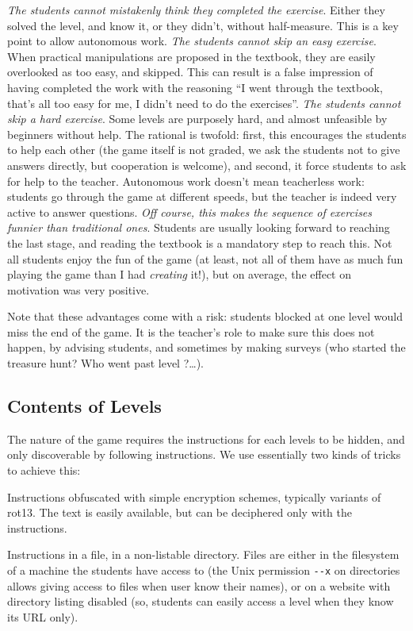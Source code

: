 \documentclass{sig-alternate}
\begin{document}
\textit{The students cannot mistakenly think they completed the
  exercise}. Either they solved the level, and know it, or they didn't,
  without half-measure. This is a key point to allow autonomous work.
\textit{The students cannot skip an easy exercise}. When practical
  manipulations are proposed in the textbook, they are easily
  overlooked as too easy, and skipped. This can result
  is a false impression of having completed the work with the
  reasoning ``I went through the textbook, that's all too easy for me,
  I didn't need to do the exercises''.
\textit{The students cannot skip a hard exercise}. Some levels are
  purposely hard, and almost unfeasible by
  beginners without help. The rational is twofold: first, this
  encourages the students to help each other (the game itself is not
  graded, we ask the students not to give answers directly, but
  cooperation is welcome), and second, it force students to ask for
  help to the teacher. Autonomous work doesn't mean teacherless work:
  students go through the game at different speeds, but the teacher is
  indeed very active to answer questions.
\textit{Off course, this makes the sequence of exercises funnier than
  traditional ones}. Students are usually looking forward to reaching
  the last stage, and reading the textbook is a mandatory step to reach
  this. Not all students enjoy the fun of the game (at least, not all
  of them have as much fun playing the game than I had \emph{creating}
  it!), but on average, the effect on motivation was very positive.

Note that these advantages come with a risk: students blocked at one
level would miss the end of the game. It is the teacher's role to make
sure this does not happen, by advising students, and sometimes by
making surveys (who started the treasure hunt? Who went past level
?\dots).

\subsection{Contents of Levels}

The nature of the game requires the instructions for each levels to be
hidden, and only discoverable by following instructions. We use
essentially two kinds of tricks to achieve this:

\begin{compactitem}
\item Instructions obfuscated with simple encryption schemes,
  typically variants of rot13. The text is easily
  available, but can be deciphered only with the
  instructions.
\item Instructions in a file, in a non-listable directory. Files are
  either in the filesystem of a machine the students have access to
  (the Unix permission \verb|--x| on directories allows giving access
  to files when user know their names), or on a website with directory
  listing disabled (so, students can easily access a level when they
  know its URL only).
\end{compactitem}
\end{document}
